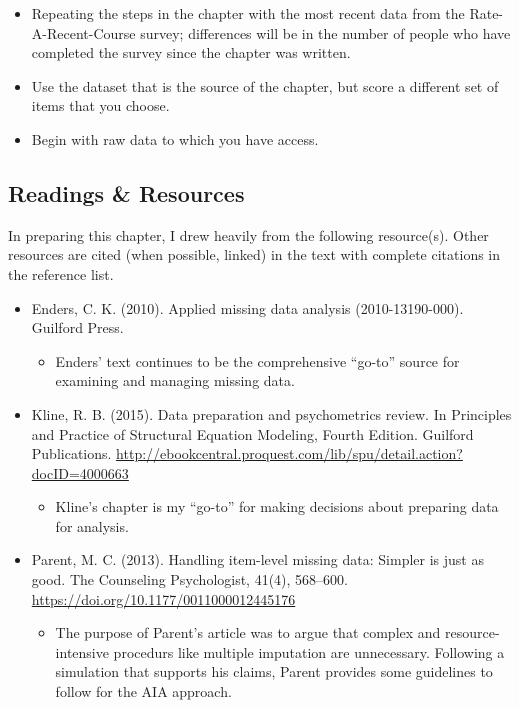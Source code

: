 \documentclass[
  11pt,
]{book}
\providecommand{\tightlist}{%
  \setlength{\itemsep}{0pt}\setlength{\parskip}{0pt}}
\begin{document}
\begin{itemize}
\tightlist
\item
  Repeating the steps in the chapter with the most recent data from the Rate-A-Recent-Course survey; differences will be in the number of people who have completed the survey since the chapter was written.
\item
  Use the dataset that is the source of the chapter, but score a different set of items that you choose.
\item
  Begin with raw data to which you have access.
\end{itemize}

\hypertarget{readings-resources-1}{%
\subsection{Readings \& Resources}\label{readings-resources-1}}

In preparing this chapter, I drew heavily from the following resource(s). Other resources are cited (when possible, linked) in the text with complete citations in the reference list.

\begin{itemize}
\tightlist
\item
  Enders, C. K. (2010). Applied missing data analysis (2010-13190-000). Guilford Press.

  \begin{itemize}
  \tightlist
  \item
    Enders' text continues to be the comprehensive ``go-to'' source for examining and managing missing data.
  \end{itemize}
\item
  Kline, R. B. (2015). Data preparation and psychometrics review. In Principles and Practice of Structural Equation Modeling, Fourth Edition. Guilford Publications. \url{http://ebookcentral.proquest.com/lib/spu/detail.action?docID=4000663}

  \begin{itemize}
  \tightlist
  \item
    Kline's chapter is my ``go-to'' for making decisions about preparing data for analysis.
  \end{itemize}
\item
  Parent, M. C. (2013). Handling item-level missing data: Simpler is just as good. The Counseling Psychologist, 41(4), 568--600. \url{https://doi.org/10.1177/0011000012445176}

  \begin{itemize}
  \tightlist
  \item
    The purpose of Parent's article was to argue that complex and resource-intensive procedurs like multiple imputation are unnecessary. Following a simulation that supports his claims, Parent provides some guidelines to follow for the AIA approach.
  \end{itemize}
\end{itemize}
\end{document}
